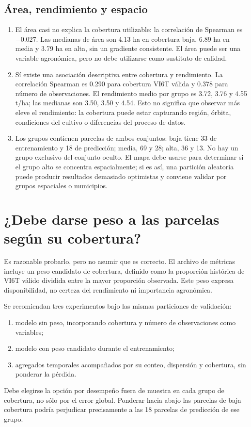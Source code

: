 \documentclass[11pt,a4paper]{article}
\begin{document}
\subsection{Área, rendimiento y espacio}
\begin{enumerate}[resume]
  \item El área casi no explica la cobertura utilizable: la correlación de
  Spearman es $-0.027$. Las medianas de área son 4.13 ha en cobertura baja,
  6.89 ha en media y 3.79 ha en alta, sin un gradiente consistente. El área puede
  ser una variable agronómica, pero no debe utilizarse como sustituto de calidad.

  \item Sí existe una asociación descriptiva entre cobertura y rendimiento. La
  correlación Spearman es 0.290 para cobertura VI6T válida y 0.378 para número de
  observaciones. El rendimiento medio por grupo es 3.72, 3.76 y 4.55 t/ha; las
  medianas son 3.50, 3.50 y 4.54. Esto no significa que observar más eleve el
  rendimiento: la cobertura puede estar capturando región, órbita, condiciones
  del cultivo o diferencias del proceso de datos.

  \item Los grupos contienen parcelas de ambos conjuntos: baja tiene 33 de
  entrenamiento y 18 de predicción; media, 69 y 28; alta, 36 y 13. No hay un
  grupo exclusivo del conjunto oculto. El mapa debe usarse para determinar si el
  grupo alto se concentra espacialmente; si es así, una partición aleatoria puede
  producir resultados demasiado optimistas y conviene validar por grupos
  espaciales o municipios.
\end{enumerate}

\section{¿Debe darse peso a las parcelas según su cobertura?}
Es razonable probarlo, pero no asumir que es correcto. El archivo de métricas
incluye un peso candidato de cobertura, definido como la proporción histórica
de VI6T válido dividida entre la mayor proporción observada. Este peso expresa
disponibilidad, no certeza del rendimiento ni importancia agronómica.

Se recomiendan tres experimentos bajo las mismas particiones de validación:
\begin{enumerate}
  \item modelo sin peso, incorporando cobertura y número de observaciones como variables;
  \item modelo con peso candidato durante el entrenamiento;
  \item agregados temporales acompañados por su conteo, dispersión y cobertura, sin ponderar la pérdida.
\end{enumerate}
Debe elegirse la opción por desempeño fuera de muestra en cada grupo de cobertura,
no sólo por el error global. Ponderar hacia abajo las parcelas de baja cobertura
podría perjudicar precisamente a las 18 parcelas de predicción de ese grupo.
\end{document}
